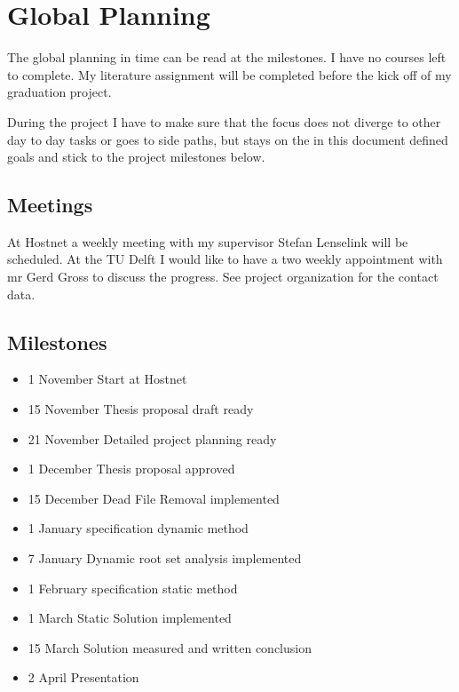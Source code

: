 \documentclass[a4paper,10pt,twocolumn]{article}
\begin{document}
\section{Global Planning}

The global planning in time can be read at the milestones. I have no courses left to complete. My literature assignment will be completed
before the kick off of my graduation project. 

During the project I have to make sure that the focus does not diverge to other day to day tasks or goes to side paths, but stays on the in this document defined goals and stick to the project milestones below. 

\subsection{Meetings}

At Hostnet a weekly meeting with my supervisor Stefan Lenselink will be scheduled. At the TU Delft I would like to have a two weekly
appointment with mr Gerd Gross to discuss the progress. See project organization for the contact data.

\subsection{Milestones}
\begin{itemize}
 \item 1 November Start at Hostnet
 \item 15 November Thesis proposal draft ready

 \item 21 November Detailed project planning ready
 \item 1 December Thesis proposal approved
 \item 15 December Dead File Removal implemented

 \item 1 January specification dynamic method
 \item 7 January Dynamic root set analysis implemented
  
 \item 1 February specification static method 
  \item 1 March Static Solution implemented
 
 \item 15 March Solution measured and written conclusion
 \item 2 April Presentation
\end{itemize}
\end{document}
